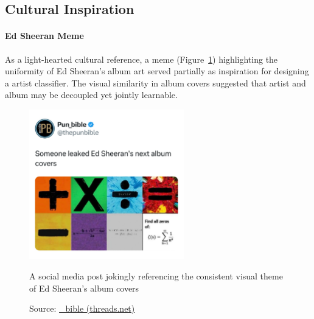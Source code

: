 \begin{uomappendix}
            \subsection{Cultural Inspiration} \label{app:Cult}
    
                \paragraph{Ed Sheeran Meme} As a light-hearted cultural reference, a meme (Figure~\ref{fig:EdMeme}) highlighting the uniformity of Ed Sheeran’s album art served partially as inspiration for designing a artist classifier. The visual similarity in album covers suggested that artist and album may be decoupled yet jointly learnable.
    
                \begin{figure}[h]
                    \centering
                    \includegraphics[width=0.6\textwidth]{images/EdSheeranMeme.jpg}
                    \caption{A social media post jokingly referencing the consistent visual theme of Ed Sheeran's album covers}
                    \label{fig:EdMeme}
                    \caption*{Source: \href{https://www.threads.net/@pun_bible/post/DB83pw3gZSh/media}{\@pun\_bible (threads.net)}}
                \end{figure}
        
    \end{uomappendix}
    
    
    